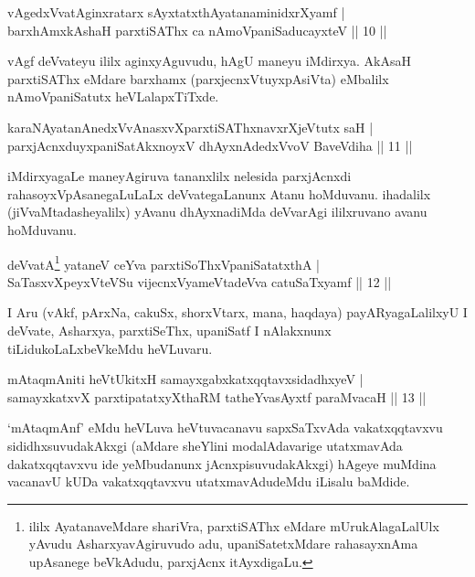 
\begin{shl}
vAgedxVvatA\s ginxratarx sAyxtatxthA\s \s yatanaminidxrXyamf |\\
barxhAmx\s \s kAshaH parxtiSAThx ca nAmoVpaniSaducayxteV \hfill || 10 || 
\end{shl}

\begin{artha}
vAgf deVvateyu ililx aginxyAguvudu, hAgU maneyu iMdirxya.  AkAsaH parxtiSAThx eMdare barxhamx (parxjecnxVtuyxpAsiVta) eMbalilx nAmoVpaniSatutx heVLalapxTiTxde.
\end{artha}


\begin{shl}
karaNAyatanAnedxVvAnasxvXparxtiSAThxnavxrXjeVtutx saH |\\
parxjAcnxduyxpaniSatAkxnoyxV dhAyxnAdedxVvoV BaveVdiha \hfill || 11 || 
\end{shl}

\begin{artha}
iMdirxyagaLe maneyAgiruva tananxlilx nelesida parxjAcnxdi rahasoyxVpAsanegaLuLaLx deVvategaLanunx Atanu hoMduvanu. ihadalilx (jiVvaMtadasheyalilx) yAvanu dhAyxnadiMda deVvarAgi ililxruvano avanu hoMduvanu.
\end{artha}

\begin{shl}
deVvatA\s\footnote{ililx AyatanaveMdare shariVra, parxtiSAThx eMdare mUrukAlagaLalUlx yAvudu AsharxyavAgiruvudo adu, upaniSatetxMdare rahasayxnAma upAsanege beVkAdudu, parxjAcnx itAyxdigaLu. } yataneV ceYva parxtiSoThxVpaniSatatxthA |\\
SaTasxvXpeyxVteVSu vijecnxVyameVtadeVva catuSaTxyamf \hfill || 12 || 
\end{shl}

\begin{artha}
I Aru (vAkf, pArxNa, cakuSx, shorxVtarx, mana, haqdaya) payARyagaLalilxyU I deVvate, Asharxya, parxtiSeThx, upaniSatf I nAlakxnunx tiLidukoLaLxbeVkeMdu heVLuvaru.
\end{artha}

\begin{shl}
mAtaqmAniti heVtUkitxH samayxgabxkatxqqtavxsidadhxyeV |\\
samayxkatxvX parxtipatatxyXthaRM tatheYvasAyxtf paraMvacaH || 13 ||
\end{shl}

\begin{artha}
`mAtaqmAnf' eMdu heVLuva heVtuvacanavu sapxSaTxvAda vakatxqqtavxvu sididhxsuvudakAkxgi (aMdare sheYlini modalAdavarige utatxmavAda dakatxqqtavxvu ide yeMbudanunx jAcnxpisuvudakAkxgi) hAgeye muMdina vacanavU kUDa vakatxqqtavxvu utatxmavAdudeMdu iLisalu baMdide.
\end{artha}

